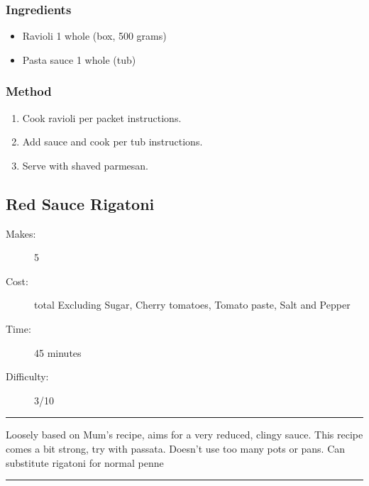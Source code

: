 \documentclass[]{article}
\begin{document}
\subsubsection*{\Large Ingredients}
\begin{multicols}{2}
\begin{itemize}
 \item Ravioli \hfill 1 whole (box, 500 grams)
 \item Pasta sauce \hfill 1 whole (tub)
\end{itemize}
\end{multicols}
\subsubsection*{\Large Method}
\begin{enumerate}[font=\huge\color{accent}]
	\item Cook ravioli per packet instructions.
	\item Add sauce and cook per tub instructions.
	\item Serve with shaved parmesan.
\end{enumerate}
\newpage
{}\label{rec:Red Sauce Rigatoni}
\subsection*{\center\huge Red Sauce Rigatoni}
\begin{description}
\item[Makes:] 5 
\item[Cost:]  total Excluding Sugar, Cherry tomatoes, Tomato paste, Salt and Pepper
\item[Time:] 45 minutes
\item[Difficulty:] 3/10
\end{description}
\vspace{0.2cm}\hrule\vspace{0.5cm}
\begin{adjustwidth}{0.5 cm}{0.5 cm}

Loosely based on Mum's recipe, aims for a very reduced, clingy sauce. This recipe comes a bit strong, try with passata. Doesn't use too many pots or pans. Can substitute rigatoni for normal penne \hfill{}\color{black}

\end{adjustwidth}
\vspace{0.5cm}\hrule
\end{document}
